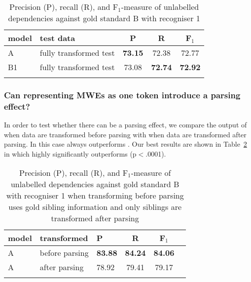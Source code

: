 \documentclass[output=paper]{langsci/langscibook}
\begin{document}
\begin{table}[h]
    \centering
    \begin{tabular}{l l c c c} %
      \lsptoprule
        \textnormal{model}
        & \textnormal{test data}
        & \textnormal{P}
        & \textnormal{R}
        & \textnormal{F$_1$}
        \\ %
        \midrule
        A & fully transformed test &\textbf{73.15}  &72.38  & 72.77 \\
        B1 & fully transformed test &73.08  &\textbf{72.74}  & \textbf{72.92} \tabularnewline %
        \lspbottomrule
    \end{tabular}
    \caption{Precision (P), recall (R), and F$_1$-measure of unlabelled dependencies against gold standard B with recogniser 1 \label{del:tab:res1bis}}
\end{table}


\subsubsection{Can representing MWEs as one token introduce a parsing effect?}
\indent In order to test whether there can be a parsing effect, we compare the output of {\modelA} when data are transformed before parsing with {\modelA} when data are transformed after parsing. In this case {\modelB} always outperforms {\modelA}. Our best results are shown in Table~\ref{del:tab:res1bisbis} in which {\modelB} highly significantly outperforms {\modelA} (p$<$.0001).

\begin{table}[h]
    \centering
    \begin{tabular}{l l l c c c} %
      \lsptoprule
        \textnormal{model}
        & \textnormal{transformed}
        & \textnormal{P}
        & \textnormal{R}
        & \textnormal{F$_1$}
        \\ %
        \midrule
        A & before parsing &\textbf{83.88}  &\textbf{84.24}  & \textbf{84.06} \\
        A & after parsing &78.92  &79.41  & 79.17  \tabularnewline %
        \lspbottomrule
    \end{tabular}
    \caption{Precision (P), recall (R), and F$_1$-measure of unlabelled dependencies against gold standard B with recogniser 1 when transforming before parsing uses gold sibling information and only siblings are transformed after parsing\label{del:tab:res1bisbis}}
\end{table}
\end{document}
